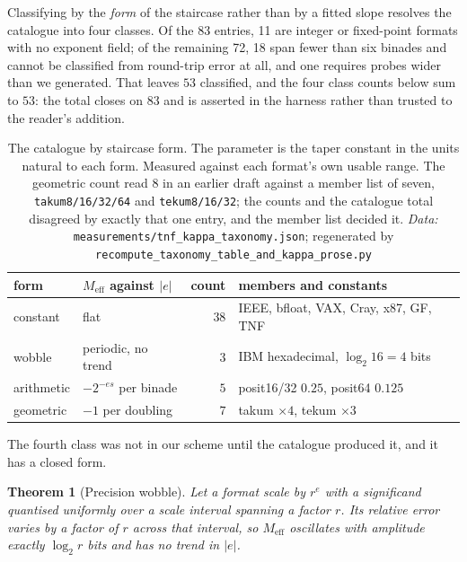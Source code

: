 \documentclass[11pt]{article}
\newtheorem{theorem}{Theorem}
\theoremstyle{definition}
\begin{document}
Classifying by the \emph{form} of the staircase rather than by a fitted slope
resolves the catalogue into four classes. Of the 83 entries, 11 are integer or
fixed-point formats with no exponent field; of the remaining 72, 18 span fewer
than six binades and cannot be classified from round-trip error at all, and one
requires probes wider than we generated. That leaves $53$ classified, and the
four class counts below sum to $53$: the total closes on $83$ and is asserted in
the harness rather than trusted to the reader's addition.

\begin{table}[t]\centering
\caption{The catalogue by staircase form. The parameter is the taper constant in
the units natural to each form. Measured against each format's own usable range.
The geometric count read $8$ in an earlier draft against a member list of seven,
\texttt{takum8/16/32/64} and \texttt{tekum8/16/32}; the counts and the catalogue
total disagreed by exactly that one entry, and the member list decided it. \emph{Data:} \texttt{measurements/tnf\_kappa\_taxonomy.json}; regenerated by \texttt{recompute\_taxonomy\_table\_and\_kappa\_prose.py}}
\label{tab:taxonomy}
\begin{tabular}{llrl}
\toprule
form & $M_{\mathrm{eff}}$ against $|e|$ & count & members and constants \\
\midrule
constant   & flat                          & $38$ & IEEE, bfloat, VAX, Cray, x87, GF, TNF \\
wobble     & periodic, no trend            & $3$  & IBM hexadecimal, $\log_2 16 = 4$ bits \\
arithmetic & $-2^{-es}$ per binade         & $5$  & posit16/32 $0.25$, posit64 $0.125$ \\
geometric  & $-1$ per doubling             & $7$  & takum $\times 4$, tekum $\times 3$ \\
\bottomrule
\end{tabular}
\end{table}

The fourth class was not in our scheme until the catalogue produced it, and it has
a closed form.

\begin{theorem}[Precision wobble]
\label{thm:wobble}
Let a format scale by $r^{e}$ with a significand quantised uniformly over a
scale interval spanning a factor $r$. Its relative error varies by a factor of
$r$ across that interval, so $M_{\mathrm{eff}}$ oscillates with amplitude exactly
$\log_2 r$ bits and has no trend in $|e|$.
\end{theorem}
\end{document}

